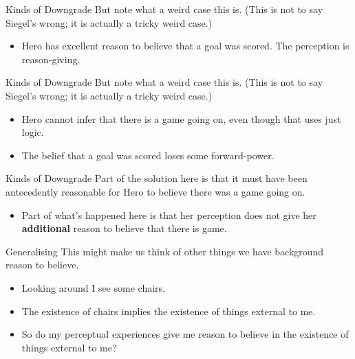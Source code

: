 \documentclass[
  17pt,
  letterpaper,
  ignorenonframetext,
  aspectratio=169,
  xcolor={dvipsnames}]{beamer}
\providecommand{\tightlist}{%
  \setlength{\itemsep}{0pt}\setlength{\parskip}{0pt}}\usepackage{longtable,booktabs,array}
\begin{document}
\begin{frame}{Kinds of Downgrade}
\protect\hypertarget{kinds-of-downgrade}{}
But note what a weird case this is. (This is not to say Siegel's wrong;
it is actually a tricky weird case.)

\begin{itemize}[<+->]
\tightlist
\item
  Hero has excellent reason to believe that a goal was scored. The
  perception is reason-giving.
\end{itemize}
\end{frame}

\begin{frame}{Kinds of Downgrade}
\protect\hypertarget{kinds-of-downgrade-1}{}
But note what a weird case this is. (This is not to say Siegel's wrong;
it is actually a tricky weird case.)

\begin{itemize}[<+->]
\tightlist
\item
  Hero cannot infer that there is a game going on, even though that uses
  just logic.
\item
  The belief that a goal was scored loses some forward-power.
\end{itemize}
\end{frame}

\begin{frame}{Kinds of Downgrade}
\protect\hypertarget{kinds-of-downgrade-2}{}
Part of the solution here is that it must have been antecedently
reasonable for Hero to believe there was a game going on.

\begin{itemize}[<+->]
\tightlist
\item
  Part of what's happened here is that her perception does not give her
  \textbf{additional} reason to believe that there is game.
\end{itemize}
\end{frame}

\begin{frame}{Generalising}
\protect\hypertarget{generalising}{}
This might make us think of other things we have background reason to
believe.

\begin{itemize}[<+->]
\tightlist
\item
  Looking around I see some chairs.
\item
  The existence of chairs implies the existence of things external to
  me.
\item
  So do my perceptual experiences give me reason to believe in the
  existence of things external to me?
\end{itemize}
\end{frame}
\end{document}
